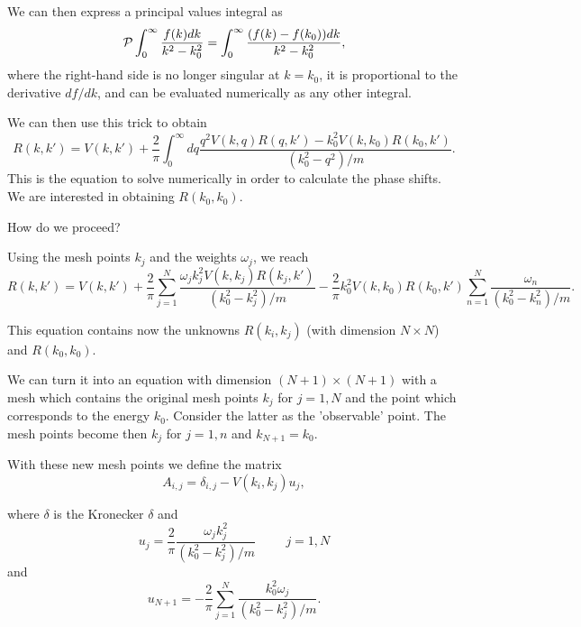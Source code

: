 \documentclass[graybox,sectrefs,envcountresetchap,open=right]{svmonodo}
\begin{document}
We can then express a principal values integral
as
\begin{equation}
  {\cal P}\int_{0}^{\infty} \frac{f(k)dk}{k^2-k_0^2} =
  \int_{0}^{\infty} \frac{(f(k)-f(k_0))dk}{k^2-k_0^2},
   \label{eq:trick}
\end{equation}
where the right-hand side is no longer singular at 
$k=k_0$, it is proportional to the derivative $df/dk$,
and can be evaluated numerically as any other integral.



We can then use this trick to obtain
\begin{equation}
    R(k,k') = V(k,k') +\frac{2}{\pi}
                \int_0^{\infty}dq
                \frac{q^2V(k,q)R(q,k')-k_0^2V(k,k_0)R(k_0,k')  }
                     {(k_0^2-q^2)/m}.
   \label{eq:ls2}
\end{equation}
This is the equation to solve numerically in order
to calculate the phase shifts. We are interested in obtaining
$R(k_0,k_0)$.



How do we proceed?

Using the mesh points $k_j$ and the weights $\omega_j$,
         we reach
\[
          R(k,k') = V(k,k') +\frac{2}{\pi}
          \sum_{j=1}^N\frac{\omega_jk_j^2V(k,k_j)R(k_j,k')}
                           {(k_0^2-k_j^2)/m}
           -\frac{2}{\pi}k_0^2V(k,k_0)R(k_0,k')
          \sum_{n=1}^N\frac{\omega_n}
                           {(k_0^2-k_n^2)/m}.                
\]



This equation contains now the unknowns $R(k_i,k_j)$
(with dimension $N\times N$) and $R(k_0,k_0)$.

We can turn it into an equation
with dimension $(N+1)\times (N+1)$ with  a mesh
which contains the original mesh points $k_j$ for $j=1,N$
and the point which corresponds to the energy $k_0$.
Consider the latter as the 'observable' point.
The mesh points become then $k_j$ for $j=1,n$ and
$k_{N+1}=k_0$. 

With these new mesh points we define the matrix
\begin{equation}
      A_{i,j}=\delta_{i,j}-V(k_i,k_j)u_j,
      \label{eq:aeq}
\end{equation}


where $\delta$ is the Kronecker $\delta$
and
\[
     u_j=\frac{2}{\pi}\frac{\omega_jk_j^2}{(k_0^2-k_j^2)/m}\hspace{1cm} j=1,N
\]
and
\[
     u_{N+1}=-\frac{2}{\pi}\sum_{j=1}^N\frac{k_0^2\omega_j}{(k_0^2-k_j^2)/m}.
\]
\end{document}
